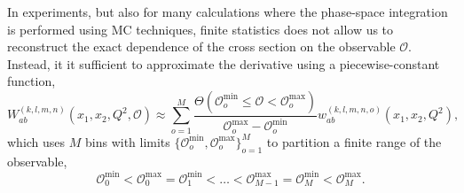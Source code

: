 In experiments, but also for many calculations where the phase-space integration is performed using MC techniques, finite statistics does not allow us to reconstruct the exact dependence of the cross section on the observable $\mathcal{O}$.
Instead, it it sufficient to approximate the derivative using a piecewise-constant function,
\begin{equation}
W_{ab}^{(k,l,m,n)} \left( x_1, x_2, Q^2, \mathcal{O} \right) \approx \sum_{o=1}^M \frac{\Theta (\mathcal{O}_o^\mathrm{min} \le \mathcal{O} < \mathcal{O}_o^\mathrm{max})}{\mathcal{O}_o^\mathrm{max} - \mathcal{O}_o^\mathrm{min}} w_{ab}^{(k,l,m,n,o)} \left( x_1, x_2, Q^2 \right) \text{,}
\end{equation}
which uses $M$ bins with limits $\{ \mathcal{O}_o^\mathrm{min}, \mathcal{O}_o^\mathrm{max} \}_{o=1}^M$ to partition a finite range of the observable,
\begin{equation}
\mathcal{O}_0^\mathrm{min} < \mathcal{O}_0^\mathrm{max} = \mathcal{O}_1^\mathrm{min} < \ldots < \mathcal{O}_{M-1}^\mathrm{max} = \mathcal{O}_M^\mathrm{min} < \mathcal{O}_M^\mathrm{max} \text{.}
\label{eq:bins-of-diff-xsection}
\end{equation}

